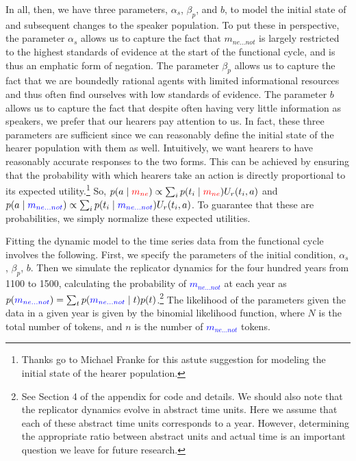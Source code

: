 \documentclass[linguex]{sp}
\theoremstyle{definition} \newtheorem{definition}{Definition}
\begin{document}
In all, then, we have three parameters, $\alpha_{s}$, $\beta_p$, and $b$, to model the initial state of and subsequent changes to the speaker population. To put these in perspective, the parameter $\alpha_{s}$ allows us to capture the fact that \textit{\color{blue} $m_{ne...not}$} is largely restricted to the highest standards of evidence at the start of the functional cycle, and is thus an emphatic form of negation. The parameter $\beta_p$ allows us to capture the fact that we are boundedly rational agents with limited informational resources and thus often find ourselves with low standards of evidence. The parameter $b$ allows us to capture the fact that despite often having very little information as speakers, we prefer that our hearers pay attention to us. In fact, these three parameters are sufficient since we can reasonably define the initial state of the hearer population with them as well. Intuitively, we want hearers to have reasonably accurate responses to the two forms. This can be achieved by ensuring that the probability with which hearers take an action is directly proportional to its expected utility.\footnote{Thanks go to Michael Franke for this astute suggestion for modeling the initial state of the hearer population.} So,  $p(a \mid \textit{\color{red} $m_{ne}$}) \propto \sum_i p(t_i \mid \textit{\color{red} $m_{ne}$}) U_r(t_i, a)$ and $p(a \mid \textit{\color{blue} $m_{ne...not}$}) \propto \sum_i p(t_i \mid \textit{\color{blue} $m_{ne...not}$}) U_r(t_i, a)$. To guarantee that these are probabilities, we simply normalize these expected utilities.

Fitting the dynamic model to the time series data from the functional cycle involves the following. First, we  specify the parameters of the initial condition, $\alpha_{s}$, $\beta_p$, $b$. Then we  simulate the replicator dynamics for the four hundred years from 1100 to 1500, calculating the probability of \textcolor{blue}{$m_{ne...not}$} at each year as $p(\textcolor{blue}{m_{ne...not}}) = \sum_t p(\textcolor{blue}{m_{ne...not}} \mid t) p(t)$.\footnote{See Section 4 of the appendix for code and details. We should also note that the replicator dynamics evolve in abstract time units. Here we assume that each of these abstract time units corresponds to a year. However, determining the appropriate ratio between abstract units and actual time is an important question we leave for future research.}  The likelihood of the parameters given the data in a given year is given by the binomial likelihood function, where $N$ is the total number of tokens, and $n$ is the number of \textcolor{blue}{$m_{ne...not}$} tokens.
\end{document}
